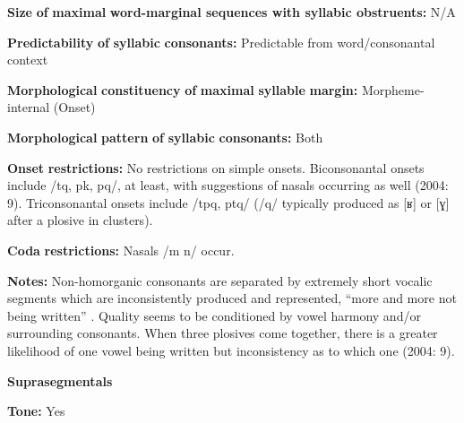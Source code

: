 \begin{styleBody}
\textbf{Size} \textbf{of} \textbf{maximal} \textbf{word{}-marginal sequences with syllabic obstruents:} N/A
\end{styleBody}

\begin{styleBody}
\textbf{Predictability} \textbf{of} \textbf{syllabic} \textbf{consonants:} Predictable from word/consonantal context
\end{styleBody}

\begin{styleBody}
\textbf{Morphological} \textbf{constituency} \textbf{of} \textbf{maximal} \textbf{syllable} \textbf{margin:} Morpheme-internal (Onset)
\end{styleBody}

\begin{styleBody}
\textbf{Morphological} \textbf{pattern} \textbf{of} \textbf{syllabic} \textbf{consonants:} Both
\end{styleBody}

\begin{styleBody}
\textbf{Onset} \textbf{restrictions:} No restrictions on simple onsets. Biconsonantal onsets include /tq, pk, pq/, at least, with suggestions of nasals occurring as well (2004: 9). Triconsonantal onsets include /tpq, ptq/ (/q/ typically produced as [ʁ] or [ɣ] after a plosive in clusters). 
\end{styleBody}

\begin{styleBody}
\textbf{Coda} \textbf{restrictions:} Nasals /m n/ occur.
\end{styleBody}

\begin{styleBody}
\textbf{Notes:} Non-homorganic consonants are separated by extremely short vocalic segments which are inconsistently produced and represented, “more and more not being written” \citep[226]{Whitehead2004}. Quality seems to be conditioned by vowel harmony and/or surrounding consonants. When three plosives come together, there is a greater likelihood of one vowel being written but inconsistency as to which one (2004: 9).
\end{styleBody}

\begin{styleBody}
\textbf{Suprasegmentals}
\end{styleBody}

\begin{styleBody}
\textbf{Tone:} Yes
\end{styleBody}

